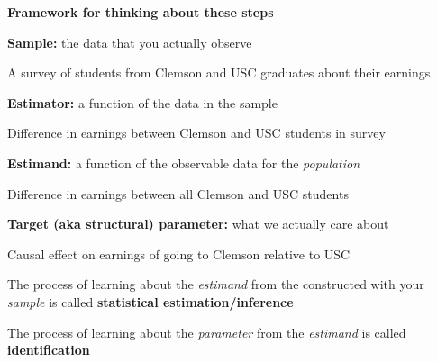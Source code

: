 \documentclass[11pt, aspectratio=169]{beamer}
\newenvironment{wideitemize}{\itemize\addtolength{\itemsep}{5pt}}{\enditemize}
\begin{document}
\begin{frame}{\bf \large Framework for thinking about these steps \hyperlink{splitprob}{}}
	
	\begin{wideitemize}
		
		\item \textbf{Sample:} the data that you actually observe
		\begin{wideitemize}
			\item
			A survey of students from Clemson and USC graduates about their earnings 
		\end{wideitemize}
		
		\item \textbf{Estimator:} a function of the data in the sample 
		\begin{wideitemize}
			\item Difference in earnings between Clemson and USC students in survey
		\end{wideitemize}
		
		\item \textbf{Estimand:} a function of the observable data for the \textit{population}
		\begin{wideitemize}
			\item Difference in earnings between all Clemson and USC students 
		\end{wideitemize}
		
		\item \textbf{Target (aka structural) parameter:} what we actually care about
		\begin{wideitemize}
			\item Causal effect on earnings of going to Clemson relative to USC
		\end{wideitemize}
		
	\end{wideitemize}	
	
	\medskip
	\pause
	\begin{wideitemize}
		
		\item The process of learning about the \textit{estimand} from the  constructed with your \textit{sample} is called \textbf{statistical estimation/inference}
		
		\item The process of learning about the \textit{parameter} from the \textit{estimand} is called \textbf{identification}
		
	\end{wideitemize}	
\end{frame}
\end{document}
